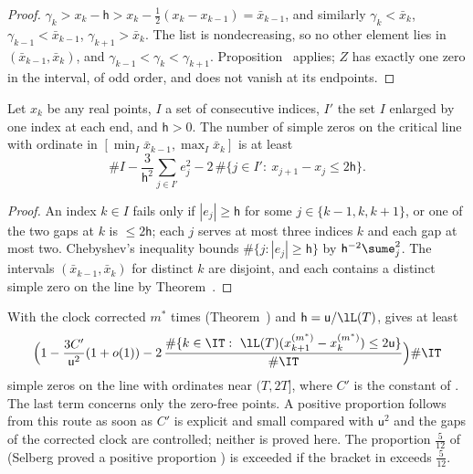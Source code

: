 \begin{proof}
$\gamma_k>x_k-\mathsf h>x_k-\frac12(x_k-x_{k-1})=\bar x_{k-1}$, and similarly $\gamma_k<\bar x_k$, $\gamma_{k-1}<\bar x_{k-1}$, $\gamma_{k+1}>\bar x_k$. The list is nondecreasing, so no other element lies in $(\bar x_{k-1},\bar x_k)$, and $\gamma_{k-1}<\gamma_k<\gamma_{k+1}$. Proposition~ applies; $Z$ has exactly one zero in the interval, of odd order, and does not vanish at its endpoints.
\end{proof}

\begin{corollary}\label{cor:proportion}
Let $x_k$ be any real points, $I$ a set of consecutive indices, $I'$ the set $I$ enlarged by one index at each end, and $\mathsf h>0$. The number of simple zeros on the critical line with ordinate in $[\min_I\bar x_{k-1},\max_I\bar x_k]$ is at least
\begin{equation}
\#I-\frac3{\mathsf h^2}\sum_{j\in I'}e_j^2-2\,\#\{j\in I':\ x_{j+1}-x_j\le2\mathsf h\}.
\label{eq:proportion}
\end{equation}
\end{corollary}

\begin{proof}
An index $k\in I$ fails  only if $|e_j|\ge\mathsf h$ for some $j\in\{k-1,k,k+1\}$, or one of the two gaps at $k$ is $\le2\mathsf h$; each $j$ serves at most three indices $k$ and each gap at most two. Chebyshev's inequality bounds $\#\{j:|e_j|\ge\mathsf h\}$ by $\mathsf h^{-2}\sume_j^2$. The intervals $(\bar x_{k-1},\bar x_k)$ for distinct $k$ are disjoint, and each contains a distinct simple zero on the line by Theorem~.
\end{proof}

With the clock corrected $m^*$ times (Theorem~) and $\mathsf h=\mathsf u/\lL(T)$,  gives at least
\begin{equation}
\Bigl(1-\frac{3C'}{\mathsf u^2}(1+o(1))-2\,\frac{\#\{k\in\IT:\ \lL(T)(x^{(m^*)}_{k+1}-x^{(m^*)}_k)\le2\mathsf u\}}{\#\IT}\Bigr)\#\IT
\label{eq:proportion_iteration}
\end{equation}
simple zeros on the line with ordinates near $(T,2T]$, where $C'$ is the constant of . The last term concerns only the zero-free points. A positive proportion follows from this route as soon as $C'$ is explicit and small compared with $\mathsf u^2$ and the gaps of the corrected clock are controlled; neither is proved here. The proportion $\frac5{12}$ of \cite{PrattRoblesZaharescuZeindler2020} (Selberg proved a positive proportion \cite{Selberg1942}) is exceeded if the bracket in  exceeds $\frac5{12}$.

